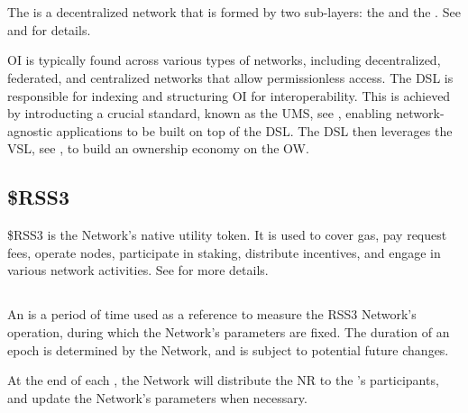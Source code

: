 \section{}

The  is a decentralized network that is formed by two sub-layers: the  and the . See  and  for details.

\gls{OI} is typically found across various types of networks, including decentralized, federated, and centralized networks that allow permissionless access.
The \gls{DSL} is responsible for indexing and structuring \gls{OI} for interoperability.
This is achieved by introducting a crucial standard, known as the \gls{UMS}, see , enabling network-agnostic applications to be built on top of the \gls{DSL}.
The \gls{DSL} then leverages the \gls{VSL}, see , to build an ownership economy on the \gls{OW}.

\subsection{\$RSS3}
\$RSS3 is the Network's native utility token. It is used to cover gas, pay request fees, operate nodes, participate in staking, distribute incentives, and engage in various network activities. See  for more details.

\subsection{}

An  is a period of time used as a reference to measure the RSS3 Network’s operation, during which the Network's parameters are fixed.
The duration of an epoch is determined by the Network, and is subject to potential future changes.

At the end of each , the Network will distribute the \gls{NR} to the 's participants, and update the Network's parameters when necessary.